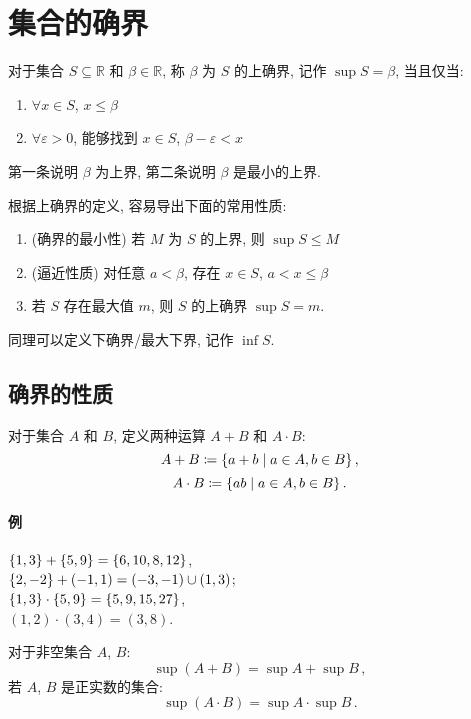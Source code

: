 \documentclass[UTF8]{ctexart}
\theoremstyle{mystyle}
\newcommand{\R}{\mathbb R}
\DeclarePairedDelimiter\set{\lbrace}{\rbrace}
\renewcommand{\epsilon}{\varepsilon}
\begin{document}
\section{集合的确界}
\begin{definition}
    对于集合 $ S \subseteq \R $ 和 $ \beta \in \R $, 称 $ \beta $ 为 $ S $ 的上确界, 记作 $ \sup S = \beta $, 当且仅当:
    \begin{enumerate}
        \item $ \forall x \in S $, $ x \leqslant \beta $
        \item $ \forall \epsilon > 0 $, 能够找到 $ x \in S $, $ \beta - \epsilon < x $
    \end{enumerate}
    第一条说明 $ \beta $ 为上界, 第二条说明 $ \beta $ 是最小的上界.
\end{definition}

根据上确界的定义, 容易导出下面的常用性质:
\begin{enumerate}
    \item (确界的最小性) 若 $ M $ 为 $ S $ 的上界, 则 $ \sup S \leqslant M $
    \item (逼近性质) 对任意 $ a < \beta $, 存在 $ x \in S $, $ a < x \leqslant \beta $
    \item 若 $ S $ 存在最大值 $ m $, 则 $ S $ 的上确界 $ \sup S = m $.
\end{enumerate}

同理可以定义下确界/最大下界, 记作 $ \inf S $.

\subsection{确界的性质}
对于集合 $ A $ 和 $ B $, 定义两种运算 $ A + B $ 和 $ A \cdot B $:
\[ A + B \coloneqq \set{a + b \mid a \in A, b \in B} \,,\]
\[ A \cdot B \coloneqq \set{ab \mid a \in A, b \in B} \,.\]

\paragraph{例}
$ \set{1, 3} + \set{5, 9} = \set{6, 10, 8, 12} $, \\
$ \set{2, -2} + (-1, 1) = (-3, -1) \cup (1, 3) $; \\
$ \set{1, 3} \cdot \set{5, 9} = \set{5, 9, 15, 27} $, \\
$ (1, 2) \cdot (3, 4) = (3, 8) $.

\begin{proposition}
    对于非空集合 $ A $, $ B $:
    \[ \sup(A + B) = \sup A + \sup B \,,\]
    若 $ A $, $ B $ 是正实数的集合:
    \[ \sup(A \cdot B) = \sup A \cdot \sup B \,. \]
\end{proposition}
\end{document}
